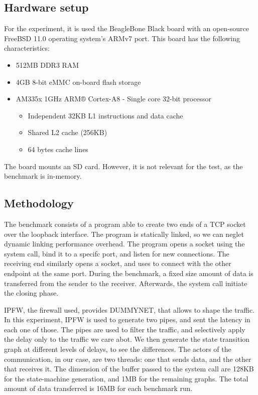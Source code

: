 \documentclass[a4paper,10pt]{article}
\begin{document}
\subsection{Hardware setup}

For the experiment, it is used the BeagleBone Black board with an open-source FreeBSD\cite{mckusick_design_2014} 11.0 operating system’s ARMv7 port. This board has the following characteristics:
\begin{itemize}
    \item 512MB DDR3 RAM
    \item 4GB 8-bit eMMC on-board flash storage
    \item AM335x 1GHz ARM® Cortex-A8 - Single core 32-bit processor\cite{noauthor_am3358_nodate}
    \begin{itemize}
        \item Independent 32KB L1 instructions and data cache
        \item Shared L2 cache (256KB)
        \item 64 bytes cache lines
    \end{itemize}
\end{itemize}

The board mounts an SD card. However, it is not relevant for the test, as the benchmark is in-memory.
      

\subsection {Methodology}

The benchmark consists of a program able to create two ends of a TCP socket over the loopback interface. The program is statically linked, so we can neglet dynamic linking performance overhead. The program opens a socket using the  system call, bind it to a specifc port, and listen for new connections. The receiving end similarly opens a socket, and uses  to connect with the other endpoint at the same port. During the benchmark, a fixed size amount of data is transferred from the sender to the receiver. Afterwards, the  system call initiate the closing phase.

IPFW, the firewall used, provides DUMMYNET\cite{luigirizzo_luigirizzodummynet_2020}, that allows to shape the traffic. In this experiment, IPFW is used to generate two pipes, and sent the latency in each one of those. The pipes are used to filter the traffic, and selectively apply the delay only to the traffic we care abot. We then generate the state transition graph at different levels of delays, to see the differences.
The actors of the communication, in our case, are two threads: one that sends data, and the other that receives it. The dimension of the buffer passed to the  system call are 128KB for the state-machine generation, and 1MB for the remaining graphs.
The total amount of data transferred is 16MB for each benchmark run.
\end{document}
